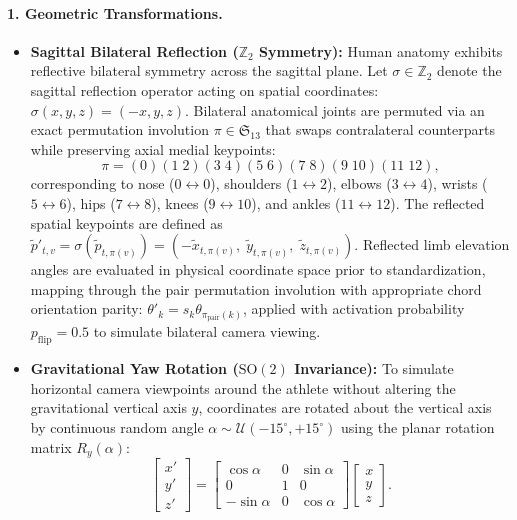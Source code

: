 \documentclass[runningheads]{llncs}
\begin{document}
\paragraph{1. Geometric Transformations.}
\begin{itemize}
    \item \textbf{Sagittal Bilateral Reflection ($\mathbb{Z}_2$ Symmetry):} Human anatomy exhibits reflective bilateral symmetry across the sagittal plane. Let $\sigma \in \mathbb{Z}_2$ denote the sagittal reflection operator acting on spatial coordinates: $\sigma(x, y, z) = (-x, y, z)$. Bilateral anatomical joints are permuted via an exact permutation involution $\pi \in \mathfrak{S}_{13}$ that swaps contralateral counterparts while preserving axial medial keypoints:
    \begin{equation}
        \pi = (0)(1 \; 2)(3 \; 4)(5 \; 6)(7 \; 8)(9 \; 10)(11 \; 12),
    \end{equation}
    corresponding to nose ($0 \leftrightarrow 0$), shoulders ($1 \leftrightarrow 2$), elbows ($3 \leftrightarrow 4$), wrists ($5 \leftrightarrow 6$), hips ($7 \leftrightarrow 8$), knees ($9 \leftrightarrow 10$), and ankles ($11 \leftrightarrow 12$). The reflected spatial keypoints are defined as $\tilde{p}'_{t, v} = \sigma( \tilde{p}_{t, \pi(v)} ) = ( -\tilde{x}_{t, \pi(v)}, \; \tilde{y}_{t, \pi(v)}, \; \tilde{z}_{t, \pi(v)} )$. Reflected limb elevation angles are evaluated in physical coordinate space prior to standardization, mapping through the pair permutation involution with appropriate chord orientation parity: $\theta'_{k} = s_k \theta_{\pi_{\text{pair}}(k)}$, applied with activation probability $p_{\text{flip}} = 0.5$ to simulate bilateral camera viewing.
    \item \textbf{Gravitational Yaw Rotation ($\mathrm{SO}(2)$ Invariance):} To simulate horizontal camera viewpoints around the athlete without altering the gravitational vertical axis $y$, coordinates are rotated about the vertical axis by continuous random angle $\alpha \sim \mathcal{U}(-15^\circ, +15^\circ)$ using the planar rotation matrix $R_y(\alpha)$:
    \begin{equation}
    \label{eq:yaw_rotation}
        \begin{bmatrix} x' \\ y' \\ z' \end{bmatrix} = \begin{bmatrix} \cos\alpha & 0 & \sin\alpha \\ 0 & 1 & 0 \\ -\sin\alpha & 0 & \cos\alpha \end{bmatrix} \begin{bmatrix} x \\ y \\ z \end{bmatrix}.

\end{equation}
\end{itemize}
\end{document}
